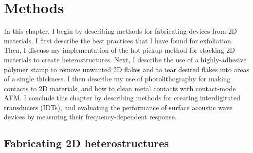 \documentclass[double,12pt,1in,seploa]{beavtex}
\let\Oldsection\section
\renewcommand{\section}{\FloatBarrier\Oldsection}
\begin{document}
\begin{center}

    \linespread{1.0}\selectfont

\end{center}






\chapter{Methods} \label{methods chapter}
In this chapter, I begin by describing methods for fabricating devices from 2D materials. I first describe the best practices that I have found for exfoliation. Then, I discuss my implementation of the hot pickup method for stacking 2D materials to create heterostructures. Next, I describe the use of a highly-adhesive polymer stamp to remove unwanted 2D flakes and to tear desired flakes into areas of a single thickness. I then describe my use of photolithography for making contacts to 2D materials, and how to clean metal contacts with contact-mode AFM. I conclude this chapter by describing methods for creating interdigitated transducers (IDTs), and evaluating the performance of surface acoustic wave devices by measuring their frequency-dependent response.

\section{Fabricating 2D heterostructures} \label{fabricating 2D devices}
\end{document}

